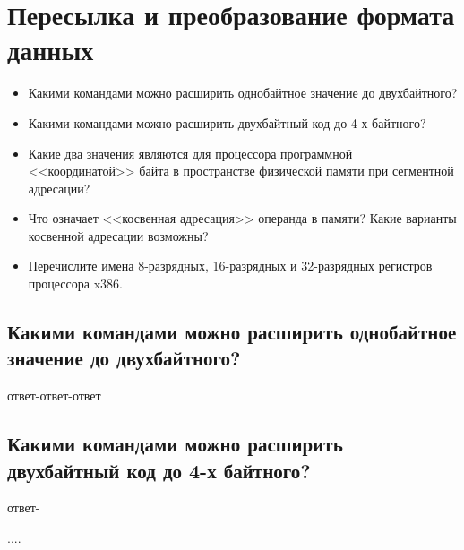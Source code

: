 \chapter{Пересылка и преобразование формата данных}
\begin{itemize}
\item Какими командами можно расширить однобайтное значение до двухбайтного?
\item Какими командами можно расширить двухбайтный код до 4-х байтного?
\item Какие два значения являются для процессора программной <<координатой>> байта в пространстве физической памяти при сегментной адресации?
\item Что означает <<косвенная адресация>> операнда в памяти? Какие варианты косвенной адресации возможны?
\item Перечислите имена 8-разрядных, 16-разрядных и 32-разрядных регистров процессора x386.
\end{itemize}

\section{Какими командами можно расширить однобайтное значение до двухбайтного?}

ответ-ответ-ответ

\section{Какими командами можно расширить двухбайтный код до 4-х байтного?}

ответ-

....

\endinput

